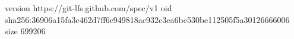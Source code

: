 version https://git-lfs.github.com/spec/v1
oid sha256:36906a15fa3c462d7ff6e949818ac932c3ea6be530be112505f5a30126666006
size 699206
